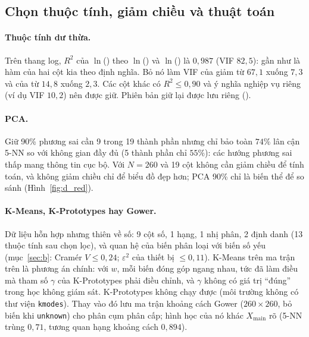 \subsection{Chọn thuộc tính, giảm chiều và thuật toán}
\paragraph{Thuộc tính dư thừa.} Trên thang log, $R^2$ của $\ln$() theo $\ln$() và $\ln$() là $0{,}987$ (VIF $82{,}5$):  gần như là hàm của hai cột kia theo định nghĩa.
Bỏ nó làm VIF của  giảm từ $67{,}1$ xuống $7{,}3$ và của  từ $14{,}8$ xuống $2{,}3$. Các cột khác có $R^2\le 0{,}90$ và ý nghĩa nghiệp vụ riêng (ví dụ  VIF $10{,}2$) nên được giữ.
Phiên bản giữ lại  được lưu riêng ().

\paragraph{PCA.} Giữ 90\% phương sai cần 9 trong 19 thành phần nhưng chỉ bảo toàn $74\%$ lân cận 5-NN so với không gian đầy đủ (5 thành phần chỉ $55\%$): các hướng phương sai thấp mang thông tin cục bộ.
Với $N=260$ và 19 cột không cần giảm chiều để tính toán, và không giảm chiều chỉ để biểu đồ đẹp hơn; PCA 90\% chỉ là biến thể để so sánh (Hình~\ref{fig:d_red}).

\paragraph{K-Means, K-Prototypes hay Gower.} Dữ liệu hỗn hợp nhưng thiên về số: 9 cột số, 1 hạng, 1 nhị phân, 2 định danh (13 thuộc tính sau chọn lọc), và quan hệ của biến phân loại với biến số yếu
(mục~\ref{sec:b}: Cramér $V\le 0{,}24$; $\varepsilon^2$ của thiết bị $\le 0{,}11$). K-Means trên ma trận trên là phương án chính: với $w$, mỗi biến đóng góp ngang nhau, tức đã làm điều mà tham số $\gamma$ của K-Prototypes phải điều chỉnh,
và $\gamma$ không có giá trị ``đúng'' trong học không giám sát. K-Prototypes không chạy được (môi trường không có thư viện \texttt{kmodes}). Thay vào đó lưu ma trận khoảng cách Gower ($260\times260$, bỏ biến khi \texttt{unknown})
cho phân cụm phân cấp; hình học của nó khác $X_{\text{main}}$ rõ (5-NN trùng $0{,}71$, tương quan hạng khoảng cách $0{,}894$).

